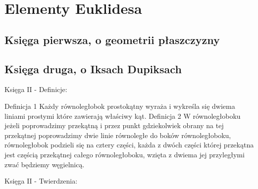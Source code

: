 
\chapter{Elementy Euklidesa}
\section{Księga pierwsza, o geometrii płaszczyzny}
















\section{Księga druga, o Iksach Dupiksach}
    Księga II - Definicje:

Definicja 1
    Każdy równoległobok prostokątny wyraża i wykreśla się dwiema liniami prostymi które zawierają właściwy kąt.
Definicja 2
    W równoległoboku jeżeli poprowadzimy przekątną i przez punkt gdziekolwiek obrany na tej przekątnej poprowadzimy dwie linie równoległe do boków równoległoboku, równoległobok podzieli się na cztery części, każda z dwóch części której przekątna jest częścią przekątnej całego równoległoboku, wzięta z dwiema jej przyległymi zwać będziemy węgielnicą.


Księga II - Twierdzenia:

